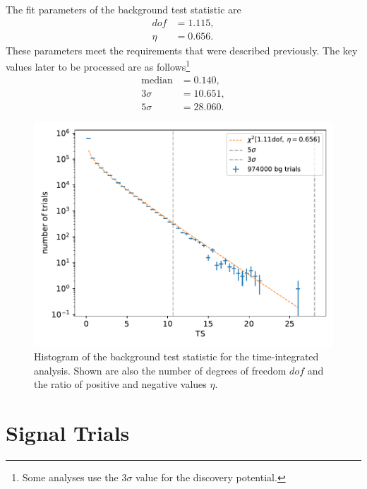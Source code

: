 The fit parameters of the background test statistic are
\begin{align}
  dof &= \num{1.115},\\
  \eta &= \num{0.656}.
\end{align}
These parameters meet the requirements that were described previously.
The key values later to be processed are as follows\footnote{Some analyses use the $3\sigma$ value for the discovery potential.}
\begin{align}
  \text{median} &= \num{0.140},\\
  3\sigma &= \num{10.651},\\
  5\sigma &= \num{28.060}.
\end{align}
\begin{figure}
    \centering
    \includegraphics[width=\linewidth]{Plots/05_csky/9_years_gfu_gold_bg_new.pdf}
    \caption{Histogram of the background test statistic for the time-integrated analysis. Shown are also the number of degrees of freedom $dof$ and the ratio of positive and negative values $\eta$.}
    \label{fig:bg_ts_time_int}
\end{figure}

\section{Signal Trials}

